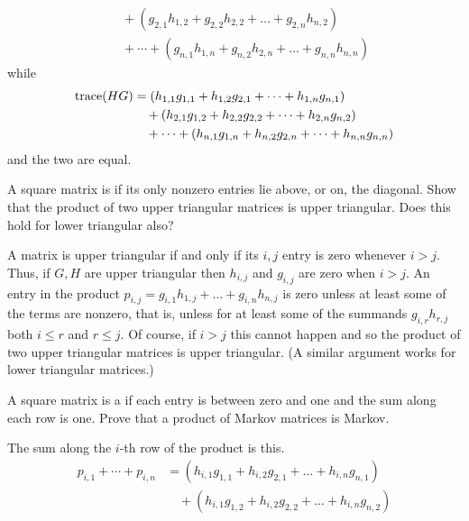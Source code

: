 \begin{exercises}
\begin{answer}
\begin{align*}
       &\text{}\quad+(g_{2,1}h_{1,2}+g_{2,2}h_{2,2}+\dots+g_{2,n}h_{n,2}) \\
       &\text{}\quad
        +\cdots+(g_{n,1}h_{1,n}+g_{n,2}h_{2,n}+\dots+g_{n,n}h_{n,n})
     \end{align*}
     while
     \begin{align*}
       \operatorname{trace} (HG)
       &=(h_{1,1}g_{1,1}+h_{1,2}g_{2,1}+\dots+h_{1,n}g_{n,1})  \\
       &\text{}\quad+(h_{2,1}g_{1,2}+h_{2,2}g_{2,2}+\dots+h_{2,n}g_{n,2}) \\
       &\text{}\quad
         +\cdots+(h_{n,1}g_{1,n}+h_{n,2}g_{2,n}+\dots+h_{n,n}g_{n,n})
     \end{align*}
     and the two are equal.  
    \end{answer}
  \recommended \item
    A square matrix is 
    if its only nonzero
    entries lie above, or on, the diagonal.
    Show that the product of two upper triangular matrices is upper triangular.
    Does this hold for lower triangular also?
    \begin{answer}
      A matrix is upper triangular if and only if its $i,j$ entry is zero 
      whenever \( i>j \).
      Thus, if \( G,H \) are upper triangular then \( h_{i,j} \) and
      \( g_{i,j} \) are zero when \( i>j \).
      An entry in the product
      \( p_{i,j}=g_{i,1}h_{1,j}+\dots+g_{i,n}h_{n,j} \)
      is zero unless at least some of the terms are nonzero, that is, unless
      for at least some of the summands
      \( g_{i,r}h_{r,j} \) both \( i\leq r \) and \( r\leq j \).
      Of course, if \( i>j \) this cannot happen and so the product of two
      upper triangular matrices is upper triangular.
      (A similar argument works for lower triangular matrices.) 
   \end{answer}
 \item 
   A square matrix is a  
   if each entry is between zero
   and one and the sum along each row is one.
   Prove that a product of Markov matrices is Markov.
   \begin{answer}
     The sum along the \( i \)-th row of the product is this.
     \begin{align*}
       p_{i,1}+\cdots+p_{i,n}
       &=(h_{i,1}g_{1,1}+h_{i,2}g_{2,1}+\dots+h_{i,n}g_{n,1})  \\
       &\text{}\quad+(h_{i,1}g_{1,2}+h_{i,2}g_{2,2}+\dots+h_{i,n}g_{n,2}) \\

\end{align*}
\end{answer}
\end{exercises}
